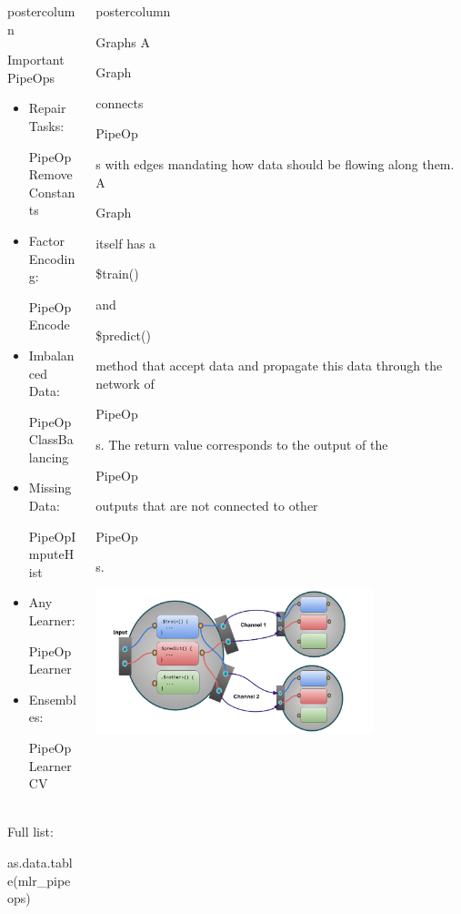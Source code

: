 \documentclass{beamer}
\newlength{\columnheight} %
\newcommand{\codeinline}[1]{\begin{codeboxinline}#1\end{codeboxinline}}
\begin{document}
\begin{frame}[fragile]{}
\begin{columns}
\begin{column}{.245\textwidth}
\begin{beamercolorbox}[center]{postercolumn}
\begin{minipage}{.98\textwidth}
{\begin{myblock}{Important PipeOps}
\begin{itemize}
                \item Repair Tasks: \codeinline{PipeOpRemoveConstants}
                \item Factor Encoding: \codeinline{PipeOpEncode}
                \item Imbalanced Data: \codeinline{PipeOpClassBalancing}
                \item Missing Data: \codeinline{PipeOpImputeHist}
                \item Any Learner: \codeinline{PipeOpLearner}
                \item Ensembles: \codeinline{PipeOpLearnerCV}
              \end{itemize}
              \ \\
              Full list: \codeinline{as.data.table(mlr\_pipeops)}
						\end{myblock}
						\vfill}
				\end{minipage}
			\end{beamercolorbox}
		\end{column}
		\begin{column}{.245\textwidth}
			\begin{beamercolorbox}[center]{postercolumn}
				\begin{minipage}{.98\textwidth}
					\parbox[t][\columnheight]{\textwidth}{
						\begin{myblock}{Graphs}
              A \codeinline{Graph} connects \codeinline{PipeOp}s with edges mandating how data should be flowing along them. A \codeinline{Graph} itself has a \codeinline{\$train()} and \codeinline{\$predict()} method that accept data and propagate this data through the network of \codeinline{PipeOp}s. The return value corresponds to the output of the \codeinline{PipeOp} outputs that are not connected to other \codeinline{PipeOp}s.
              \begin{center}
                \includegraphics[width=0.75\textwidth]{img/po_multi_viz.png}
              \end{center}

\end{myblock}}
\end{minipage}
\end{beamercolorbox}
\end{column}
\end{columns}
\end{frame}
\end{document}
